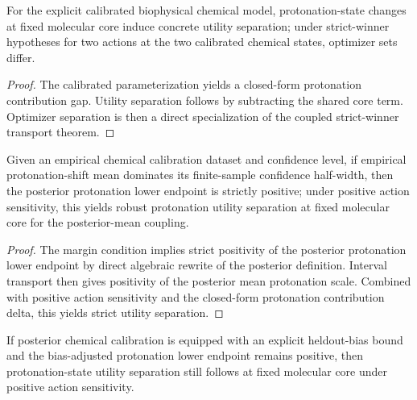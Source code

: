 \begin{theorem}\label{thm:calibrated-biophysical-chemical-separation}
For the explicit calibrated biophysical chemical model, protonation-state changes at fixed molecular core induce concrete utility separation; under strict-winner hypotheses for two actions at the two calibrated chemical states, optimizer sets differ.
\end{theorem}

\begin{proof}
The calibrated parameterization yields a closed-form protonation contribution gap. Utility separation follows by subtracting the shared core term. Optimizer separation is then a direct specialization of the coupled strict-winner transport theorem.
\end{proof}

\begin{theorem}\label{thm:chemical-dataset-posterior-separation}
Given an empirical chemical calibration dataset and confidence level, if empirical protonation-shift mean dominates its finite-sample confidence half-width, then the posterior protonation lower endpoint is strictly positive; under positive action sensitivity, this yields robust protonation utility separation at fixed molecular core for the posterior-mean coupling.
\end{theorem}

\begin{proof}
The margin condition implies strict positivity of the posterior protonation lower endpoint by direct algebraic rewrite of the posterior definition. Interval transport then gives positivity of the posterior mean protonation scale. Combined with positive action sensitivity and the closed-form protonation contribution delta, this yields strict utility separation.
\end{proof}

\begin{theorem}\label{thm:chemical-realdata-bias-aware-separation}
If posterior chemical calibration is equipped with an explicit heldout-bias bound and the bias-adjusted protonation lower endpoint remains positive, then protonation-state utility separation still follows at fixed molecular core under positive action sensitivity.
\end{theorem}

